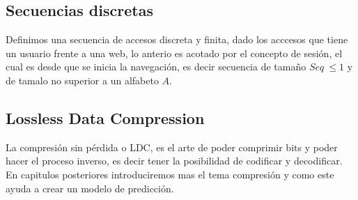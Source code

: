 


\subsection{Secuencias discretas}

Definimos una secuencia de accesos discreta y finita, dado los acccesos que tiene un usuario frente a una web, lo anterio es acotado por el concepto de sesión, el cual es desde que se inicia la navegación, es decir secuencia de tamaño $Seq\ \leq 1$ y de tamalo no superior a un alfabeto $A$.


\subsection{Lossless Data Compression}

La compresión sin pérdida o LDC, es el arte de poder comprimir bits y poder hacer el proceso inverso, es decir tener la posibilidad de codificar y decodificar. En capitulos posteriores introduciremos mas el tema compresión y como este ayuda a crear un modelo de predicción.


